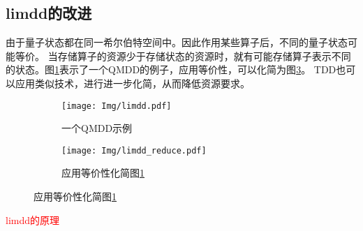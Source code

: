 \subsection*{limdd的改进}
由于量子状态都在同一希尔伯特空间中。因此作用某些算子后，不同的量子状态可能等价。
当存储算子的资源少于存储状态的资源时，就有可能存储算子表示不同的状态\citep{vinkhuijzen2023limdd}。图\ref{fig:qmdd-example}表示了一个QMDD的例子，应用等价性，可以化简为图\ref{fig:limdd-example}。
TDD也可以应用类似技术，进行进一步化简，从而降低资源要求。
\begin{figure}[!htbp]
    \centering
    \begin{subfigure}[b]{.4\textwidth}
        \centering
        \texttt{[image: Img/limdd.pdf]}
        \caption{一个QMDD示例}
        \label{fig:qmdd-example}
    \end{subfigure}
    \begin{subfigure}[b]{.4\textwidth}
        \centering
        \texttt{[image: Img/limdd\_reduce.pdf]}
        \caption{应用等价性化简图\ref{fig:qmdd-example}}
        \label{fig:limdd-example}
    \end{subfigure}
\end{figure}
\textcolor{red}{limdd的原理}
